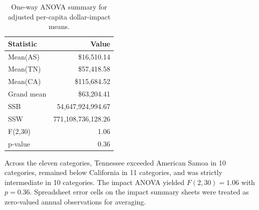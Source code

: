 \begin{table}[H]
  \centering
  \caption{Adjusted per-capita dollar-impact: Hypothesis test outcomes at $\alpha = 0.05$.}
  \label{tab:anova-impact-outcomes}
  \small
\end{table}

\begin{table}[H]
  \centering
  \caption{One-way ANOVA summary for adjusted per-capita dollar-impact means.}
  \label{tab:anova-impact-summary}
  \begin{tabular}{@{}lr@{}}
    \toprule
    Statistic & Value\\
    \midrule
    Mean(AS) & \$16{,}510.14\\
    Mean(TN) & \$57{,}418.58\\
    Mean(CA) & \$115{,}684.52\\
    Grand mean & \$63{,}204.41\\
    SSB & 54{,}647{,}924{,}994.67\\
    SSW & 771{,}108{,}736{,}128.26\\
    F(2,30) & 1.06\\
    p-value & 0.36\\
    \bottomrule
  \end{tabular}
\end{table}

Across the eleven categories, Tennessee exceeded American Samoa in 10 categories, remained below California in 11 categories, and was strictly intermediate in 10 categories. The impact ANOVA yielded $F(2,30)=1.06$ with $p=0.36$. Spreadsheet error cells on the impact summary sheets were treated as zero-valued annual observations for averaging.

